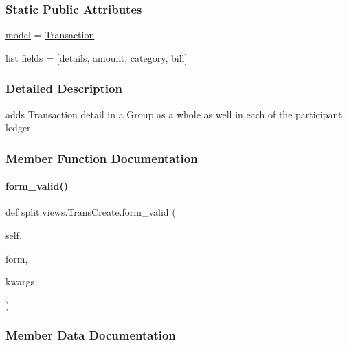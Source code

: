\subsubsection*{Static Public Attributes}
\begin{DoxyCompactItemize}
\item 
\hyperlink{classsplit_1_1views_1_1TransCreate_a49e18bca3ac80c3dc757e3c4cec53f36}{model} = \hyperlink{classtxn_1_1models_1_1Transaction}{Transaction}
\item 
list \hyperlink{classsplit_1_1views_1_1TransCreate_a697876b60cb95c3523caeedc13e05cdc}{fields} = \mbox{[}\textquotesingle{}details\textquotesingle{}, \textquotesingle{}amount\textquotesingle{}, \textquotesingle{}category\textquotesingle{}, \textquotesingle{}bill\textquotesingle{}\mbox{]}
\end{DoxyCompactItemize}


\subsubsection{Detailed Description}
adds Transaction detail in a Group as a whole as well in each of the participant ledger. 

\subsubsection{Member Function Documentation}
\mbox{\label{classsplit_1_1views_1_1TransCreate_ad192972eafc095c971f6df984fcec0fa}} 
\paragraph{\texorpdfstring{form\+\_\+valid()}{form\_valid()}}
{\footnotesize\ttfamily def split.\+views.\+Trans\+Create.\+form\+\_\+valid (\begin{DoxyParamCaption}\item[{}]{self,  }\item[{}]{form,  }\item[{}]{kwargs }\end{DoxyParamCaption})}



\subsubsection{Member Data Documentation}
\mbox{\label{classsplit_1_1views_1_1TransCreate_a697876b60cb95c3523caeedc13e05cdc}} 
